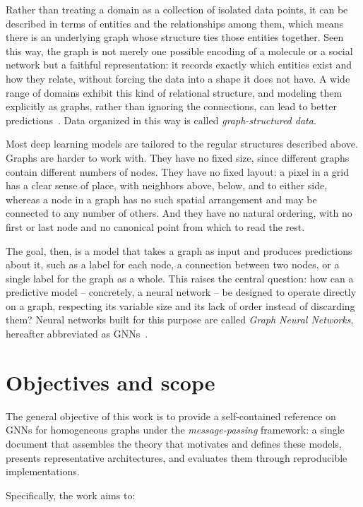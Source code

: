 Rather than treating a domain as a collection of isolated data points, it can be
described in terms of entities and the relationships among them, which means
there is an underlying graph whose structure ties those entities together. Seen
this way, the graph is not merely one possible encoding of a molecule or a
social network but a faithful representation: it records exactly
which entities exist and how they relate, without forcing the data into a shape
it does not have. A wide range of domains exhibit this kind of relational
structure, and modeling them explicitly as graphs, rather than ignoring the
connections, can lead to better predictions~\cite[3.5pc]{battaglia2018}. Data
organized in this way is called \textit{graph-structured data}.

Most deep learning models are tailored to the regular structures
described above. Graphs are harder to work with. 
They have no fixed size, since different graphs contain
different numbers of nodes. They have no fixed layout: a pixel in a grid has a
clear sense of place, with neighbors above, below, and to either side, whereas a
node in a graph has no such spatial arrangement and may be connected to any
number of others. And they have no natural ordering, with no first or last node
and no canonical point from which to read the rest.

The goal, then, is a model that takes a graph as input and produces
predictions about it, such as a label for each node, a connection between
two nodes, or a single label for the graph as a whole. This raises
the central question: how can a predictive model -- concretely, a neural
network -- be designed to operate directly on a graph, respecting its variable
size and its lack of order instead of discarding them? Neural networks built for
this purpose are called \textit{Graph Neural Networks},
hereafter abbreviated as GNNs~\cite{hamilton2020}.

\section{Objectives and scope}
\label{sec:objectives-scope}

The general objective of this work is to provide a self-contained
reference on GNNs for homogeneous graphs under the \textit{message-passing}
framework: a single document that assembles the theory that motivates and defines
these models, presents representative architectures, and 
evaluates them through reproducible implementations.

Specifically, the work aims to:

